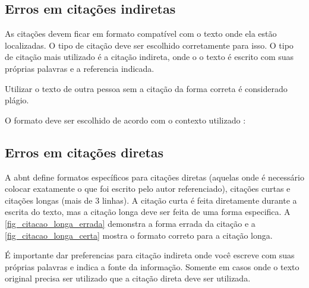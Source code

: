 \subsection{Erros em citações indiretas}
\label{erros-citacoes-indiretas}

As citações devem ficar em formato compatível com o texto onde ela estão localizadas. O tipo de citação deve ser escolhido corretamente para isso. O tipo de citação mais utilizado é a citação indireta, onde o o texto é escrito com suas próprias palavras e a referencia indicada.

Utilizar o texto de outra pessoa sem a citação da forma correta é  considerado plágio.




O formato deve ser escolhido de acordo com o contexto utilizado :

\begin{itemize}



\end{itemize}


\subsection{Erros em citações diretas}
\label{erros-citacoes-diretas}

A \ac{abnt} define formatos específicos para citações diretas (aquelas onde é necessário colocar exatamente o que foi escrito pelo autor referenciado), citações curtas e citações longas (mais de 3 linhas). A citação curta é feita diretamente durante a escrita do texto, mas a citação longa deve ser feita de uma forma especifica. A \autoref{fig_citacao_longa_errada} demonstra a forma errada da citação e a \autoref{fig_citacao_longa_certa} mostra o formato correto para a citação longa.

É importante dar preferencias para citação indireta onde você escreve com suas próprias palavras e indica a fonte da informação. Somente em casos onde o texto original precisa ser utilizado que a citação direta deve ser utilizada.


